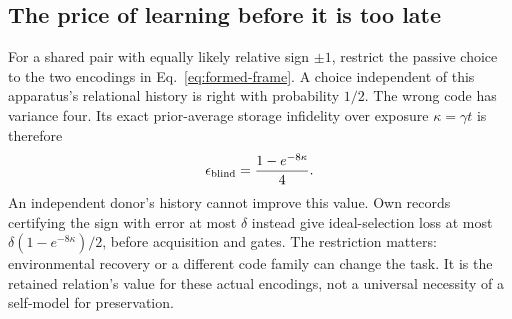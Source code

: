 \documentclass[11pt]{article}
\theoremstyle{definition}
\theoremstyle{remark}
\begin{document}
\subsection{The price of learning before it is too late}

For a shared pair with equally likely relative sign $\pm1$, restrict the
passive choice to the two encodings in Eq.~\eqref{eq:formed-frame}.
A choice independent of this apparatus's relational history is right with
probability $1/2$. The wrong code has variance four. Its exact prior-average
storage infidelity over exposure $\kappa=\gamma t$ is therefore
\begin{equation}\label{eq:frame-memory-price}
 \epsilon_{\rm blind}=\frac{1-e^{-8\kappa}}4.
\end{equation}
An independent donor's history cannot improve this value. Own records
certifying the sign with error at most $\delta$ instead give ideal-selection
loss at most $\delta(1-e^{-8\kappa})/2$, before acquisition and gates.
The restriction matters: environmental recovery or a different code family
can change the task. It is the retained relation's value for these actual
encodings, not a universal necessity of a self-model for preservation.
\end{document}
